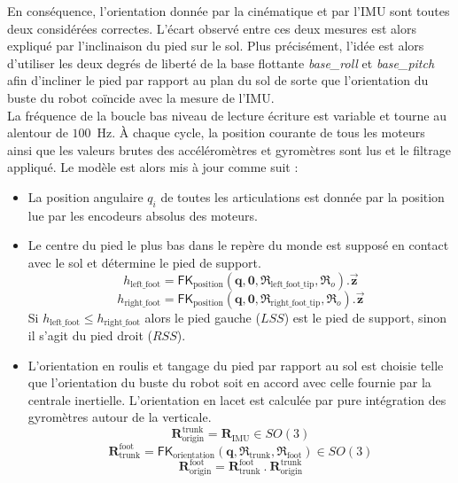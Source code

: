 En conséquence, l'orientation donnée par la cinématique et par l'IMU sont toutes
deux considérées correctes. 
L'écart observé entre ces deux mesures est alors expliqué par l'inclinaison
du pied sur le sol.
Plus précisément, l'idée est alors d'utiliser les deux degrés de liberté 
de la base flottante \textit{base\_roll} et \textit{base\_pitch}
afin d'incliner le pied par rapport au plan du sol de sorte que l'orientation
du buste du robot coïncide avec la mesure de l'IMU.\\

La fréquence de la boucle bas niveau de lecture écriture 
est variable et tourne au alentour de $100$~Hz.
À chaque cycle, la position courante de tous les moteurs ainsi
que les valeurs brutes des accéléromètres et gyromètres sont
lus et le filtrage appliqué. 
Le modèle est alors mis à jour comme suit :
\begin{itemize}
    \item La position angulaire $q_i$ de toutes les articulations
        est donnée par la position lue par les encodeurs absolus des moteurs.
    \item Le centre du pied le plus bas dans le repère du monde 
        est supposé en contact avec le sol et détermine le pied de support.
        $$
        h_{\text{left\_foot}} = 
        \mathsf{FK}_{\text{position}}(\bm{q}, \bm{0}, \mathfrak{R}_{\text{left\_foot\_tip}}, \mathfrak{R}_{o}).\vec{\bm{z}}
        $$
        $$
        h_{\text{right\_foot}} = 
        \mathsf{FK}_{\text{position}}(\bm{q}, \bm{0}, \mathfrak{R}_{\text{right\_foot\_tip}}, \mathfrak{R}_{o}).\vec{\bm{z}}
        $$
        Si $h_{\text{left\_foot}} \leqslant h_{\text{right\_foot}}$ alors 
        le pied gauche ($LSS$) est le pied de support, sinon il s'agit du pied droit ($RSS$). 
    \item L'orientation en roulis et tangage du pied par rapport au sol
        est choisie telle que l'orientation du buste du robot soit en accord avec celle fournie
        par la centrale inertielle. 
        L'orientation en lacet est calculée par pure intégration
        des gyromètres autour de la verticale.
        $$
        \bm{R}_{\text{origin}}^{\text{trunk}} = \bm{R}_{\text{IMU}} \in SO(3)
        $$
        $$
        \bm{R}_{\text{trunk}}^{\text{foot}} = 
        \mathsf{FK}_{\text{orientation}}(\bm{q}, \mathfrak{R}_{\text{trunk}}, \mathfrak{R}_{\text{foot}})
        \in SO(3)
        $$
        $$
        \bm{R}_{\text{origin}}^{\text{foot}} = 
        \bm{R}_{\text{trunk}}^{\text{foot}}~.~
        \bm{R}_{\text{origin}}^{\text{trunk}}
$$
\end{itemize}
